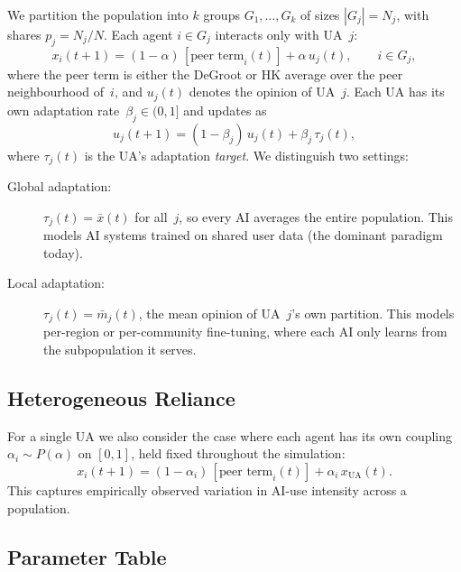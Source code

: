 \documentclass{article}
\theoremstyle{plain}
\theoremstyle{definition}
\theoremstyle{remark}
\newcommand{\xUA}{x_{\mathrm{UA}}}
\newcommand{\xbar}{\bar{x}}
\newcommand{\mbar}{\bar{m}}
\begin{document}
We partition the population into $k$ groups $G_1,\ldots,G_k$ of sizes
$|G_j|=N_j$, with shares $p_j=N_j/N$.  Each agent
$i\in G_j$ interacts only with UA~$j$:
\begin{equation}
    x_i(t+1) = (1-\alpha)\,[\text{peer term}_i(t)]
              + \alpha\,u_j(t),
    \qquad i\in G_j,
    \label{eq:multi_agent}
\end{equation}
where the peer term is either the DeGroot or HK average over the
peer neighbourhood of~$i$, and $u_j(t)$ denotes the opinion of UA~$j$.
Each UA has its own adaptation rate~$\beta_j\in(0,1]$ and updates as
\begin{equation}
    u_j(t+1) = (1-\beta_j)\,u_j(t) + \beta_j\,\tau_j(t),
    \label{eq:multi_ua}
\end{equation}
where $\tau_j(t)$ is the UA's adaptation \emph{target}.  We
distinguish two settings:
\begin{description}
    \item[Global adaptation:] $\tau_j(t) = \xbar(t)$ for all~$j$, so
        every AI averages the entire population.  This models AI
        systems trained on shared user data (the dominant paradigm
        today).
    \item[Local adaptation:] $\tau_j(t) = \mbar_j(t)$, the mean opinion
        of UA~$j$'s own partition.  This models per-region or
        per-community fine-tuning, where each AI only learns from the
        subpopulation it serves.
\end{description}

\subsection{Heterogeneous Reliance}
\label{subsec:hetero}

For a single UA we also consider the case where each agent has its own
coupling $\alpha_i\sim P(\alpha)$ on $[0,1]$, held fixed throughout
the simulation:
\begin{equation}
    x_i(t+1) = (1-\alpha_i)\,[\text{peer term}_i(t)]
              + \alpha_i\,\xUA(t).
    \label{eq:hetero}
\end{equation}
This captures empirically observed variation in AI-use intensity
across a population.

\subsection{Parameter Table}
\end{document}
